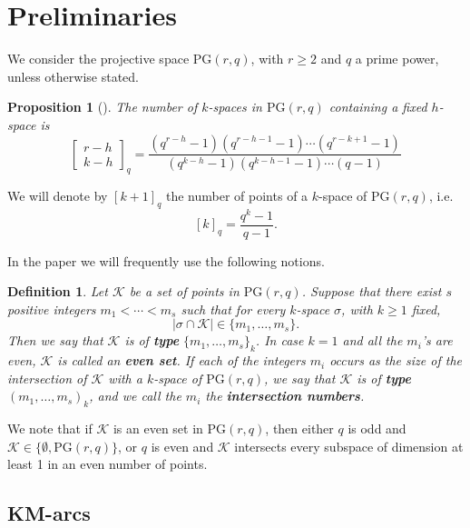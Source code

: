 \documentclass[11pt]{amsart}
\newtheorem{definition}[theorem]{Definition}
\newtheorem{proposition}[theorem]{Proposition}
\newcommand{\PG}{\mathrm{PG}}
\newcommand\qbin[3]{\left[\begin{matrix} #1 \\ #2 \end{matrix} \right]_{#3}}
\newcommand{\sam}[1]{\textcolor{purple}{#1}}
\newcommand{\jo}[1]{\textcolor{red}{#1}}
\begin{document}
\section{Preliminaries}\label{sec:prel}

We consider the projective space $\PG(r,q)$, with $r\geq 2$ and $q$ a prime power, unless otherwise stated.

\begin{proposition}[{\cite[Theorem 3.1.1]{hirschfeld1979}}] \label{prop:numbersubapcescontaining}
The number of $k$-spaces in $\PG(r,q)$ containing a fixed $h$-space is 
\[
\qbin{r-h}{k-h}{q}=\frac{(q^{r-h}-1)(q^{r-h-1}-1)\cdots (q^{r-k+1}-1)}{(q^{k-h}-1)(q^{k-h-1}-1)\cdots (q-1)}
\]
\end{proposition}

We will denote by $[k+1]_q$ the number of points of a $k$-space of $\PG(r,q)$, i.e.
\[
[k]_q=\frac{q^{k}-1}{q-1}.
\]

In the paper we will frequently use the following notions.

\begin{definition}
Let $\mathcal K$ be a set of points in $\mathrm{PG}(r,q)$. Suppose that there exist $s$ positive integers $m_1 < \cdots < m_s$ such that for every $k$-space $\sigma$, with $k\geq 1$ fixed,
$$\vert \sigma \cap {\mathcal K}\vert \in \{m_1, \ldots, m_s\}.$$
Then we say that $\mathcal{K}$ is of \textbf{type} $\{m_1, \ldots, m_s\}_k$.
In case $k=1$ and all the $m_i$'s are even, $\mathcal K$ is called an \textbf{even set}.
If each of the integers $m_i$ occurs as the size of the intersection of $\mathcal K$ with a $k$-space of $\mathrm{PG}(r, q)$, we say that $\mathcal{K}$ is of  \textbf{type} $(m_1, \ldots, m_s)_k$, and we call the $m_i$ the \textbf{intersection numbers}. 
\end{definition}

We note that if $\mathcal K$ is an even set in $\PG(r,q)$, then either $q$ is odd and $\mathcal K \in \{\emptyset, \PG(r,q)\}$, or $q$ is even and $\mathcal K$ intersects every subspace of dimension at least 1 in an even number of points.%


\subsection{KM-arcs}  
\end{document}
